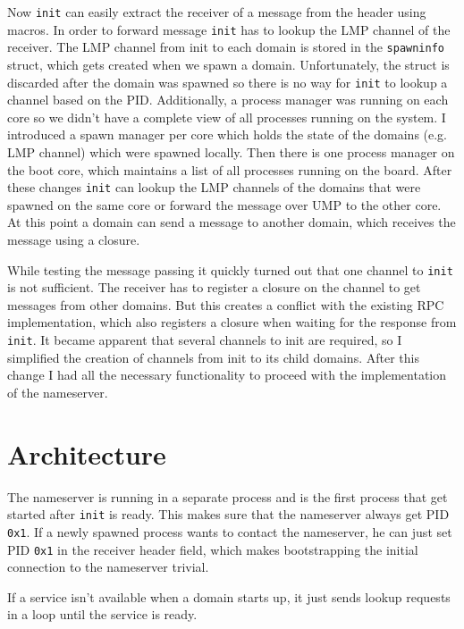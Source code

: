 Now \verb|init| can easily extract the receiver of a message from the header using macros. In order to forward
message \verb|init| has to lookup the LMP channel of the receiver. The LMP channel from init to each domain is
stored in the \verb|spawninfo| struct, which gets created when we spawn a domain. Unfortunately, the struct is
discarded after the domain was spawned so there is no way for \verb|init| to lookup a channel based on the PID.
Additionally, a process manager was running on each core so we didn't have a complete view of all processes
running on the system. I introduced a spawn manager per core which holds the state of the domains (e.g. LMP channel)
which were spawned locally. Then there is one process manager on the boot core, which maintains a list of all
processes running on the board. After these changes \verb|init| can lookup the LMP channels of the domains that
were spawned on the same core or forward the message over UMP to the other core. At this point a domain can send
a message to another domain, which receives the message using a closure.

While testing the message passing it quickly turned out that one channel to \verb|init| is not sufficient. The receiver
has to register a closure on the channel to get messages from other domains. But this creates a conflict with the 
existing RPC implementation, which also registers a closure when waiting for the response from \verb|init|. It became
apparent that several channels to init are required, so I simplified the creation of channels from init to its child
domains. After this change I had all the necessary functionality to proceed with the implementation of the nameserver.

\section{Architecture}
\label{ns-architecture}

The nameserver is running in a separate process and is the first process that get started after \verb|init| is ready. This makes
sure that the nameserver always get PID \texttt{0x1}. If a newly spawned process wants to contact the nameserver, he can just
set PID \texttt{0x1} in the receiver header field, which makes bootstrapping the initial connection to the nameserver trivial.

If a service isn't available when a domain starts up, it just sends lookup requests in a loop until the service is ready.

